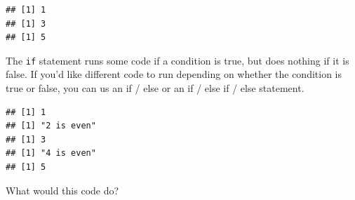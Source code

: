 \documentclass[]{book}
\makeatletter
\newenvironment{Shaded}{\begin{snugshade}}{\end{snugshade}}
\newcommand{\KeywordTok}[1]{\textcolor[rgb]{0.13,0.29,0.53}{\textbf{{#1}}}}
\newcommand{\DecValTok}[1]{\textcolor[rgb]{0.00,0.00,0.81}{{#1}}}
\newcommand{\StringTok}[1]{\textcolor[rgb]{0.31,0.60,0.02}{{#1}}}
\newcommand{\NormalTok}[1]{{#1}}
\newenvironment{kframe}{%
\medskip{}
\setlength{\fboxsep}{.8em}
 \def\at@end@of@kframe{}%
 \ifinner\ifhmode%
  \def\at@end@of@kframe{\end{minipage}}%
  \begin{minipage}{\columnwidth}%
 \fi\fi%
 \def\FrameCommand##1{\hskip\@totalleftmargin \hskip-\fboxsep
 \colorbox{shadecolor}{##1}\hskip-\fboxsep
     \hskip-\linewidth \hskip-\@totalleftmargin \hskip\columnwidth}%
 \MakeFramed {\advance\hsize-\width
   \@totalleftmargin\z@ \linewidth\hsize
   \@setminipage}}%
 {\par\unskip\endMakeFramed%
 \at@end@of@kframe}
\renewenvironment{Shaded}{\begin{kframe}}{\end{kframe}}
\makeatother
\begin{document}
\begin{Shaded}
\end{Shaded}

\begin{verbatim}
## [1] 1
## [1] 3
## [1] 5
\end{verbatim}

The \texttt{if} statement runs some code if a condition is true, but
does nothing if it is false. If you'd like different code to run
depending on whether the condition is true or false, you can us an if /
else or an if / else if / else statement.

\begin{Shaded}
\end{Shaded}

\begin{verbatim}
## [1] 1
## [1] "2 is even"
## [1] 3
## [1] "4 is even"
## [1] 5
\end{verbatim}

What would this code do? \bigskip 

\begin{Shaded}
\end{Shaded}
\end{document}
